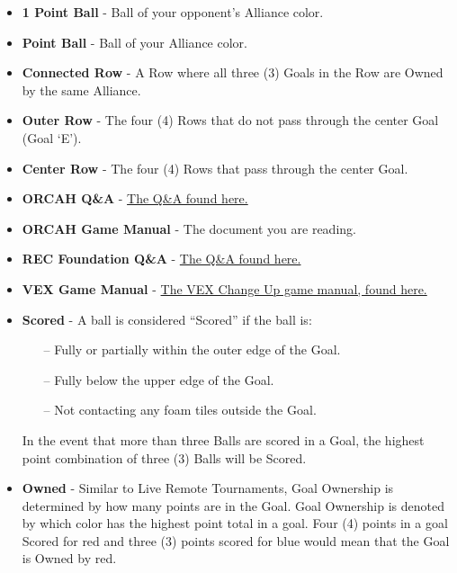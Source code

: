 \documentclass[letterpaper, 12pt]{article}
\begin{document}
\begin{itemize}[label={}]

\item\textbf{1 Point Ball} - Ball of your opponent’s Alliance color.

\item\textbf{Point Ball} - Ball of your Alliance color.

\item\textbf{Connected Row} - A Row where all three (3) Goals in the Row are Owned by the same Alliance.

\item\textbf{Outer Row} - The four (4) Rows that do not pass through the center Goal (Goal ‘E’).

\item\textbf{Center Row} - The four (4) Rows that pass through the center Goal.

\item\textbf{ORCAH Q\&A} - \href{https://sites.google.com/view/orcah-robotics/qa?authuser=0}{The Q\&A found here.}

\item\textbf{ORCAH Game Manual} - The document you are reading.

\item\textbf{REC Foundation Q\&A} - \href{https://www.robotevents.com/VRC/2020-2021/QA}{The Q\&A found here.}

\item\textbf{VEX Game Manual} - \href{https://content.vexrobotics.com/docs/vrc-change-up/Game-Manual-12012020.pdf}{The VEX Change Up game manual, found here.}

\item\textbf{Scored} - A ball is considered “Scored” if the ball is:

\begin{itemize}
\item[--] Fully or partially within the outer edge of the Goal.
\item[--] Fully below the upper edge of the Goal.
\item[--] Not contacting any foam tiles outside the Goal.
\end{itemize}

In the event that more than three Balls are scored in a Goal, the highest point combination of three (3) Balls will be Scored.

\item\textbf{Owned} - Similar to Live Remote Tournaments, Goal Ownership is determined by how many points are in the Goal. Goal Ownership is denoted by which color has the highest point total in a goal. Four (4) points in a goal Scored for red and three (3) points scored for blue would mean that the Goal is Owned by red.


\end{itemize}
\end{document}
